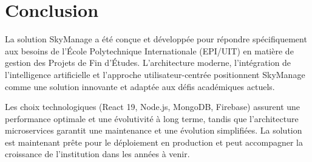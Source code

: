 \section{Conclusion}

La solution SkyManage a été conçue et développée pour répondre spécifiquement aux besoins de l'École Polytechnique Internationale (EPI/UIT) en matière de gestion des Projets de Fin d'Études. L'architecture moderne, l'intégration de l'intelligence artificielle et l'approche utilisateur-centrée positionnent SkyManage comme une solution innovante et adaptée aux défis académiques actuels.

Les choix technologiques (React 19, Node.js, MongoDB, Firebase) assurent une performance optimale et une évolutivité à long terme, tandis que l'architecture microservices garantit une maintenance et une évolution simplifiées. La solution est maintenant prête pour le déploiement en production et peut accompagner la croissance de l'institution dans les années à venir.
